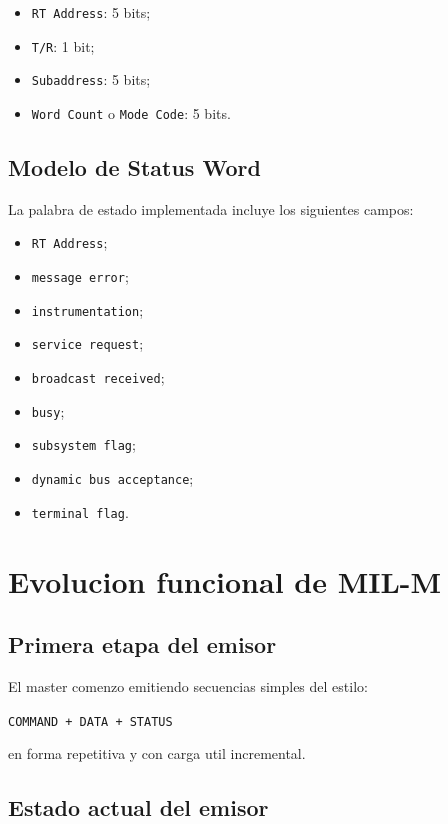 \documentclass[12pt,a4paper]{article}
\begin{document}
\begin{itemize}
    \item \texttt{RT Address}: 5 bits;
    \item \texttt{T/R}: 1 bit;
    \item \texttt{Subaddress}: 5 bits;
    \item \texttt{Word Count} o \texttt{Mode Code}: 5 bits.
\end{itemize}

\subsection{Modelo de Status Word}

La palabra de estado implementada incluye los siguientes campos:

\begin{itemize}
    \item \texttt{RT Address};
    \item \texttt{message error};
    \item \texttt{instrumentation};
    \item \texttt{service request};
    \item \texttt{broadcast received};
    \item \texttt{busy};
    \item \texttt{subsystem flag};
    \item \texttt{dynamic bus acceptance};
    \item \texttt{terminal flag}.
\end{itemize}

\section{Evolucion funcional de MIL-M}

\subsection{Primera etapa del emisor}

El master comenzo emitiendo secuencias simples del estilo:

\begin{center}
\texttt{COMMAND + DATA + STATUS}
\end{center}

en forma repetitiva y con carga util incremental.

\subsection{Estado actual del emisor}
\end{document}
